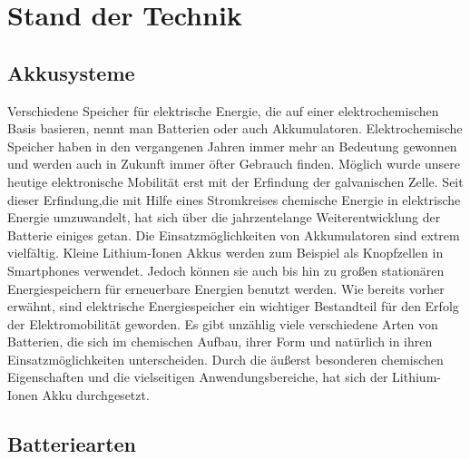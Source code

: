 \chapter{Stand der Technik}
\section{Akkusysteme}
Verschiedene Speicher für elektrische Energie, die auf einer elektrochemischen Basis basieren, nennt man Batterien oder auch Akkumulatoren. Elektrochemische Speicher haben in den vergangenen Jahren immer mehr an Bedeutung gewonnen und werden auch in Zukunft immer öfter Gebrauch finden. Möglich wurde unsere heutige elektronische Mobilität erst mit der Erfindung der galvanischen Zelle. Seit dieser Erfindung,die mit Hilfe eines Stromkreises chemische Energie in elektrische Energie umzuwandelt, hat sich über die jahrzentelange Weiterentwicklung der Batterie einiges getan. Die Einsatzmöglichkeiten von Akkumulatoren sind extrem vielfältig. Kleine Lithium-Ionen Akkus werden zum Beispiel als Knopfzellen in Smartphones verwendet. Jedoch können sie auch bis hin zu großen stationären Energiespeichern für erneuerbare Energien benutzt werden. Wie bereits vorher erwähnt, sind elektrische Energiespeicher ein wichtiger Bestandteil für den Erfolg der Elektromobilität geworden. Es gibt unzählig viele verschiedene Arten von Batterien, die sich im chemischen Aufbau, ihrer Form und natürlich in ihren Einsatzmöglichkeiten unterscheiden. Durch die äußerst besonderen chemischen Eigenschaften und die vielseitigen Anwendungsbereiche, hat sich der Lithium-Ionen Akku durchgesetzt.
\newpage

\section{Batteriearten}

